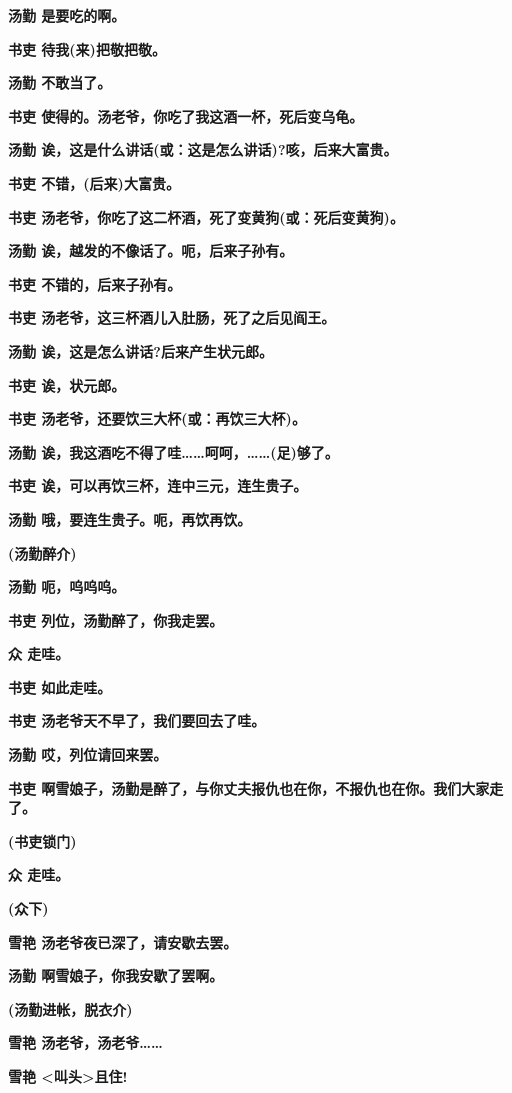 \textbf{汤勤 是要吃的啊。}

\textbf{书吏 待我(来)把敬把敬。}

\textbf{汤勤 不敢当了。}

\textbf{书吏 使得的。汤老爷，你吃了我这酒一杯，死后变乌龟。}

\textbf{汤勤 诶，这是什么讲话(或：这是怎么讲话)?咳，后来大富贵。}

\textbf{书吏 不错，(后来)大富贵。}

\textbf{书吏 汤老爷，你吃了这二杯酒，死了变黄狗(或：死后变黄狗)。}

\textbf{汤勤 诶，越发的不像话了。呃，后来子孙有。}

\textbf{书吏 不错的，后来子孙有。}

\textbf{书吏 汤老爷，这三杯酒儿入肚肠，死了之后见阎王。}

\textbf{汤勤 诶，这是怎么讲话?后来产生状元郎。}

\textbf{书吏 诶，状元郎。}

\textbf{书吏 汤老爷，还要饮三大杯(或：再饮三大杯)。}

\textbf{汤勤
诶，我这酒吃不得了哇\ldots{}\ldots{}呵呵，\ldots{}\ldots{}(足)够了。}

\textbf{书吏 诶，可以再饮三杯，连中三元，连生贵子。}

\textbf{汤勤 哦，要连生贵子。呃，再饮再饮。}

\textbf{(汤勤醉介)}

\textbf{汤勤 呃，呜呜呜。}

\textbf{书吏 列位，汤勤醉了，你我走罢。}

\textbf{众 走哇。}

\textbf{书吏 如此走哇。}

\textbf{书吏 汤老爷天不早了，我们要回去了哇。}

\textbf{汤勤 哎，列位请回来罢。}

\textbf{书吏
啊雪娘子，汤勤是醉了，与你丈夫报仇也在你，不报仇也在你。我们大家走了。}

\textbf{(书吏锁门)}

\textbf{众 走哇。}

\textbf{(众下)}

\textbf{雪艳 汤老爷夜已深了，请安歇去罢。}

\textbf{汤勤 啊雪娘子，你我安歇了罢啊。}

\textbf{(汤勤进帐，脱衣介)}

\textbf{雪艳 汤老爷，汤老爷\ldots{}\ldots{}}

\textbf{雪艳 \textless{}叫头\textgreater{}且住!}

